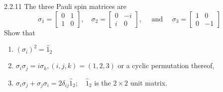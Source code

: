 \documentclass{article}
\begin{document}
\begin{flushleft}
\newpage

\begin{mybox}{2.2.11}
The three Pauli spin matrices are
$$
\sigma_{1}=\begin{bmatrix}{0} & {1} \\ {1} & {0}\end{bmatrix}, \quad \sigma_{2}=\begin{bmatrix}{0} & {-i} \\ {i} & {0}\end{bmatrix}, \quad \text { and } \quad \sigma_{3}=\begin{bmatrix}{1} & {0} \\ {0} & {-1}\end{bmatrix}
$$
Show that

\begin{enumerate}[$(a)$]
\item $\left(\sigma_{i}\right)^{2}=\hat{1}_{2}$
\item $\sigma_{i} \sigma_{j}=i \sigma_{k},(i, j, k)=(1,2,3)$ or a cyclic permutation thereof,
\item $\sigma_{i} \sigma_{j}+\sigma_{j} \sigma_{i}=2 \delta_{i j} \hat{1}_{2} ; \quad \hat{1}_{2}$ is the $2 \times 2$ unit matrix.
\end{enumerate}
\end{mybox}


\end{flushleft}
\end{document}
